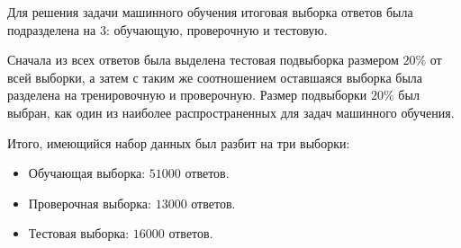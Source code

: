 \documentclass[../diploma.tex]{subfiles}
\begin{document}
	Для решения задачи машинного обучения итоговая выборка ответов была подразделена на $3$: обучающую, проверочную и тестовую.

	Сначала из всех ответов была выделена тестовая подвыборка размером $20 \%$ от всей выборки, 
	а затем с таким же соотношением оставшаяся выборка была разделена на тренировочную и проверочную.
	Размер подвыборки $20 \%$ был выбран, как один из наиболее распространенных для задач машинного обучения.

	Итого, имеющийся набор данных был разбит на три выборки:

	\begin{itemize}

		\item
		Обучающая выборка: $51000$ ответов.

		\item
		Проверочная выборка: $13000$ ответов.

		\item 
		Тестовая выборка: $16000$ ответов.

	\end{itemize}
	
\end{document}
